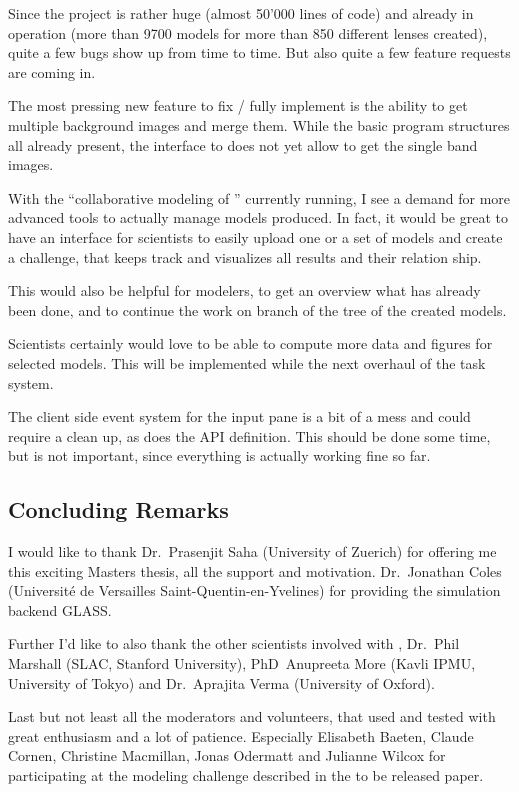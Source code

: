 Since the project is rather huge (almost 50'000 lines of code) and already in operation (more than 9700 models for more than 850 different lenses created), quite a few bugs show up from time to time.
But also quite a few feature requests are coming in.

The most pressing new feature to fix / fully implement is the ability to get multiple background images and merge them. While the basic program structures all already present, the interface to \sw does not yet allow to get the single band images.

With the ``collaborative modeling of '' currently running, I see a demand for more advanced tools to actually manage models produced. In fact, it would be great to have an interface for scientists to easily upload one or a set of models and create a challenge, that keeps track and visualizes all results and their relation ship.

This would also be helpful for modelers, to get an overview what has already been done, and to continue the work on branch of the tree of the created models.

Scientists certainly would love to be able to compute more data and figures for selected models.
This will be implemented while the next overhaul of the task system.

The client side event system for the input pane is a bit of a mess and could require a clean up, as does the API definition.
This should be done some time, but is not important, since everything is actually working fine so far.


\subsection{Concluding Remarks}

I would like to thank Dr.~Prasenjit Saha (University of Zuerich) for offering me this exciting Masters thesis, all the support and motivation. Dr.~Jonathan Coles (Université de Versailles Saint-Quentin-en-Yvelines) for providing the simulation backend GLASS.

Further I'd like to also thank the other scientists involved with \sw, Dr.~Phil Marshall (SLAC, Stanford University), PhD~Anupreeta More (Kavli IPMU, University of Tokyo) and Dr.~Aprajita Verma (University of Oxford).

Last but not least all the \sw moderators and volunteers, that used and tested \spl with great enthusiasm and a lot of patience. Especially Elisabeth Baeten, Claude Cornen, Christine Macmillan, Jonas Odermatt and Julianne Wilcox for participating at the modeling challenge described in the to be released paper.